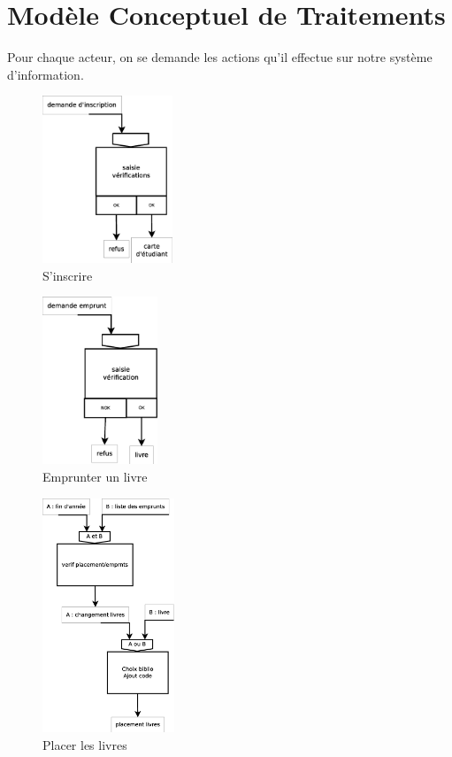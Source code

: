 \newpage
\section*{Modèle Conceptuel de Traitements}

Pour chaque acteur, on se demande les actions qu'il effectue sur notre système d'information.

\begin{figure}[!htb]
    \begin{center}
    \includegraphics[height=5cm]{images/cc2_mct1.eps}
    \caption{\label{cc2_mct1} S'inscrire}
    \end{center}
\end{figure}

\begin{figure}[!htb]
    \begin{center}
    \includegraphics[height=5cm]{images/cc2_mct2.eps}
    \caption{\label{cc2_mct2} Emprunter un livre}
    \end{center}
\end{figure}

\begin{figure}[!htb]
    \begin{center}
    \includegraphics[height=7cm]{images/cc2_mct3.eps}
    \caption{\label{cc2_mct3} Placer les livres}
    \end{center}
\end{figure}

